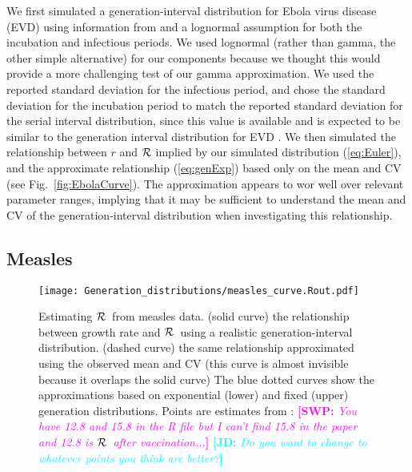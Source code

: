 \documentclass[12pt,]{article}
\newcommand{\RR}{\ensuremath{{\cal R}}}
\newcommand{\eref}[1]{(\ref{eq:#1})}
\newcommand{\fref}[1]{Fig.~\ref{fig:#1}}
\newcommand{\comment}[3]{\textcolor{#1}{\textbf{[#2: }\textit{#3}\textbf{]}}}
\newcommand{\jd}[1]{\comment{cyan}{JD}{#1}}
\newcommand{\swp}[1]{\comment{magenta}{SWP}{#1}}
\begin{document}
We first simulated a generation-interval distribution for Ebola virus disease (EVD) using information from \cite{AylwBarb14} and a lognormal assumption for both the incubation and infectious periods.
We used lognormal (rather than gamma, the other simple alternative) for our components because we thought this would provide a more challenging test of our gamma approximation. 
We used the reported standard deviation for the infectious period, and chose the standard deviation for the incubation period to match the reported standard deviation for the serial interval distribution, since this value is available and is expected to be similar to the generation interval distribution for EVD \cite{AylwBarb14}.
We  then simulated the relationship between $r$ and $\RR$ implied by our simulated distribution \eref{Euler}, and the approximate relationship \eref{genExp} based only on the mean and CV (see \fref{EbolaCurve}). The approximation appears to wor well over relevant parameter ranges, implying that it may be sufficient to understand the mean and CV of the generation-interval distribution when investigating this relationship.

\subsection{Measles}

\begin{figure}[htbp] \centering
	\texttt{[image: Generation\_distributions/measles\_curve.Rout.pdf]}
	\caption{Estimating \RR~from measles data.
		(solid curve) the relationship between growth rate and \RR~using a realistic generation-interval distribution.
		(dashed curve) the same relationship approximated using the observed mean and CV (this curve is almost invisible because it overlaps the solid curve)
		The blue dotted curves show the approximations based on exponential (lower) and fixed (upper) generation distributions.
		Points are estimates from \cite{AndeMay82}:
		\swp{You have 12.8 and 15.8 in the R file but I can't find 15.8 in the paper and 12.8 is \RR\ after vaccination...}
		\jd{Do you want to change to whatever points you think are better?}
	}
	\label{fig:measlesCurve}
\end{figure}
\end{document}
